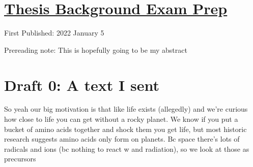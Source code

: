 \documentclass[12pt]{article}[titlepage]
\newcommand{\1}{\={a}}
\newcommand{\2}{\={e}}
\newcommand{\3}{\={\i}}
\newcommand{\4}{\=o}
\newcommand{\5}{\=u}
\newcommand{\6}{\={A}}
\renewcommand{\,}{\textsuperscript{,}}
\begin{document}
\doublespacing
\section{\href{thesis-background-prep-1.html}{Thesis Background Exam Prep}}
First Published: 2022 January 5

Prereading note: This is hopefully going to be my abstract
\section{Draft 0: A text I sent}
So yeah our big motivation is that like life exists (allegedly) and we're curious how close to life you can get without a rocky planet. We know if you put a bucket of amino acids together and shock them you get life, but most historic research suggests amino acids only form on planets. Bc space there's lots of radicals and ions (bc nothing to react w and radiation), so we look at those as precursors
\end{document}
